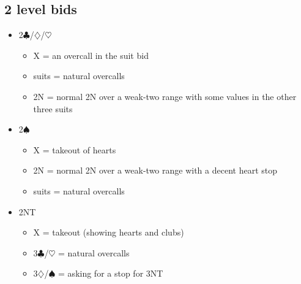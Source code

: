 \documentclass[a4paper,14pt]{extarticle}
\begin{document}
\subsection{2 level bids}

\begin{itemize}
\item 2$\clubsuit$/$\diamondsuit$/$\heartsuit$
	\begin{itemize}
	\item X = an overcall in the suit bid
	\item suits = natural overcalls
	\item 2N = normal 2N over a weak-two range with some values in the other three suits
	\end{itemize}
\item 2$\spadesuit$
	\begin{itemize}
	\item X = takeout of hearts
	\item 2N = normal 2N over a weak-two range with a decent heart stop
	\item suits = natural overcalls
	\end{itemize}
\item 2NT
	\begin{itemize}
	\item X = takeout (showing hearts and clubs)
	\item 3$\clubsuit$/$\heartsuit$ = natural overcalls
	\item 3$\diamondsuit$/$\spadesuit$ = asking for a stop for 3NT
	\end{itemize}
\end{itemize}
\end{document}
